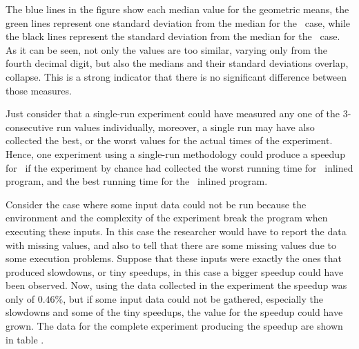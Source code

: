 The blue lines in the figure show each median value for the geometric means, the green lines represent one standard deviation from the median for the \FDI\ case, while the black lines represent the standard deviation from the median for the \llvm\ case. As it can be seen, not only the values are too similar, varying only from the fourth decimal digit, but also the medians and their standard deviations overlap, collapse. This is a strong indicator that there is no significant difference between those measures.

Just consider that a single-run experiment could have measured any one of the $3$-consecutive run values individually, moreover, a single run may have also collected the best, or the worst values for the actual times of the experiment. Hence, one experiment using a single-run methodology could produce a speedup for \FDI\ if the experiment by chance had collected the worst running time for \llvm\ inlined program, and the best running time for the \FDI\ inlined program.


Consider the case where some input data could not be run because the environment and the complexity of the experiment break the program when executing these inputs. In this case the researcher would have to report the data with missing values, and also to tell that there are some missing values due to some execution problems. Suppose that these inputs were exactly the ones that produced slowdowns, or tiny speedups, in this case a bigger speedup could have been observed. Now, using the data collected in the experiment the speedup was only of $0.46 \%$, but if some input data could not be gathered, especially the slowdowns and some of the tiny speedups, the value for the speedup could have grown. The data for the complete experiment producing the speedup are shown in table .

